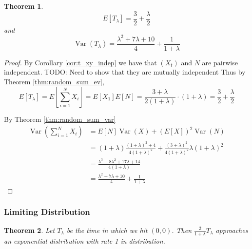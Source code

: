\documentclass{article}
\theoremstyle{plain}
\newtheorem{theorem}{Theorem}[section]
\theoremstyle{definition}
\theoremstyle{remark}
\newcommand{\Var}{\operatorname {Var}}
\begin{document}
\begin{theorem}
$$
E[T_\lambda] = \frac{3}{2} + \frac{\lambda}{2}
$$
and
$$
\Var(T_\lambda) = \frac{\lambda^2 + 7 \lambda + 10}{4} + \frac{1}{1 + \lambda}
$$
\end{theorem}

\begin{proof}
By Corollary \ref{cor:t_xy_indep} we have that $(X_t)$ and $N$ are pairwise independent.
TODO: Need to show that they are mutually independent
Thus by Theorem \eqref{thm:random_sum_ev},
$$
E[T_\lambda] = E\left[ \sum_{i = 1}^N X_i \right] = E[X_1] E[N] = \frac{3 + \lambda}{2(1 + \lambda)} \cdot (1 + \lambda) = \frac{3}{2} + \frac{\lambda}{2}
$$

By Theorem \ref{thm:random_sum_var}
\begin{align*}
    \Var\left( \sum_{i = 1}^N X_i \right) &= E[N]\Var(X) + (E[X])^2 \Var(N)\\
    &= (1 + \lambda) \frac{(1 + \lambda)^2 + 4}{4(1 + \lambda)^2} + \frac{(3 + \lambda)^2}{4 (1 + \lambda)^2} \lambda (1 + \lambda)^2\\
    &= \frac{\lambda^3 + 8 \lambda^2 + 17 \lambda + 14}{4(1 + \lambda)}\\
    &= \frac{\lambda^2 + 7 \lambda + 10}{4} + \frac{1}{1 + \lambda}
\end{align*}
\end{proof}

\subsubsection{Limiting Distribution}

\begin{theorem}
Let $T_\lambda$ be the time in which we hit $(0,0)$.
Then $\frac{2}{1 + \lambda} T_\lambda$ approaches an exponential distribution with rate 1 in distribution.
\end{theorem}
\end{document}
